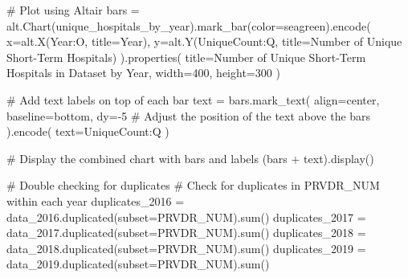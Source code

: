 \documentclass[
  letterpaper,
  DIV=11,
  numbers=noendperiod]{scrartcl}
\newenvironment{Shaded}{\begin{snugshade}}{\end{snugshade}}
\newcommand{\BuiltInTok}[1]{\textcolor[rgb]{0.00,0.23,0.31}{#1}}
\newcommand{\CommentTok}[1]{\textcolor[rgb]{0.37,0.37,0.37}{#1}}
\newcommand{\DecValTok}[1]{\textcolor[rgb]{0.68,0.00,0.00}{#1}}
\newcommand{\NormalTok}[1]{\textcolor[rgb]{0.00,0.23,0.31}{#1}}
\newcommand{\OperatorTok}[1]{\textcolor[rgb]{0.37,0.37,0.37}{#1}}
\newcommand{\StringTok}[1]{\textcolor[rgb]{0.13,0.47,0.30}{#1}}
\begin{document}
\begin{Shaded}
\begin{Highlighting}[]
\CommentTok{\# Plot using Altair}
\NormalTok{bars }\OperatorTok{=}\NormalTok{ alt.Chart(unique\_hospitals\_by\_year).mark\_bar(color}\OperatorTok{=}\StringTok{\textquotesingle{}seagreen\textquotesingle{}}\NormalTok{).encode(}
\NormalTok{    x}\OperatorTok{=}\NormalTok{alt.X(}\StringTok{\textquotesingle{}Year:O\textquotesingle{}}\NormalTok{, title}\OperatorTok{=}\StringTok{\textquotesingle{}Year\textquotesingle{}}\NormalTok{),}
\NormalTok{    y}\OperatorTok{=}\NormalTok{alt.Y(}\StringTok{\textquotesingle{}UniqueCount:Q\textquotesingle{}}\NormalTok{, title}\OperatorTok{=}\StringTok{\textquotesingle{}Number of Unique Short{-}Term Hospitals\textquotesingle{}}\NormalTok{)}
\NormalTok{).properties(}
\NormalTok{    title}\OperatorTok{=}\StringTok{\textquotesingle{}Number of Unique Short{-}Term Hospitals in Dataset by Year\textquotesingle{}}\NormalTok{,}
\NormalTok{    width}\OperatorTok{=}\DecValTok{400}\NormalTok{,}
\NormalTok{    height}\OperatorTok{=}\DecValTok{300}
\NormalTok{)}

\CommentTok{\# Add text labels on top of each bar}
\NormalTok{text }\OperatorTok{=}\NormalTok{ bars.mark\_text(}
\NormalTok{    align}\OperatorTok{=}\StringTok{\textquotesingle{}center\textquotesingle{}}\NormalTok{,}
\NormalTok{    baseline}\OperatorTok{=}\StringTok{\textquotesingle{}bottom\textquotesingle{}}\NormalTok{,}
\NormalTok{    dy}\OperatorTok{={-}}\DecValTok{5}  \CommentTok{\# Adjust the position of the text above the bars}
\NormalTok{).encode(}
\NormalTok{    text}\OperatorTok{=}\StringTok{\textquotesingle{}UniqueCount:Q\textquotesingle{}}
\NormalTok{)}

\CommentTok{\# Display the combined chart with bars and labels}
\NormalTok{(bars }\OperatorTok{+}\NormalTok{ text).display()}


\CommentTok{\# Double checking for duplicates}
\CommentTok{\# Check for duplicates in PRVDR\_NUM within each year}
\NormalTok{duplicates\_2016 }\OperatorTok{=}\NormalTok{ data\_2016.duplicated(subset}\OperatorTok{=}\StringTok{\textquotesingle{}PRVDR\_NUM\textquotesingle{}}\NormalTok{).}\BuiltInTok{sum}\NormalTok{()}
\NormalTok{duplicates\_2017 }\OperatorTok{=}\NormalTok{ data\_2017.duplicated(subset}\OperatorTok{=}\StringTok{\textquotesingle{}PRVDR\_NUM\textquotesingle{}}\NormalTok{).}\BuiltInTok{sum}\NormalTok{()}
\NormalTok{duplicates\_2018 }\OperatorTok{=}\NormalTok{ data\_2018.duplicated(subset}\OperatorTok{=}\StringTok{\textquotesingle{}PRVDR\_NUM\textquotesingle{}}\NormalTok{).}\BuiltInTok{sum}\NormalTok{()}
\NormalTok{duplicates\_2019 }\OperatorTok{=}\NormalTok{ data\_2019.duplicated(subset}\OperatorTok{=}\StringTok{\textquotesingle{}PRVDR\_NUM\textquotesingle{}}\NormalTok{).}\BuiltInTok{sum}\NormalTok{()}


\end{Highlighting}
\end{Shaded}
\end{document}
